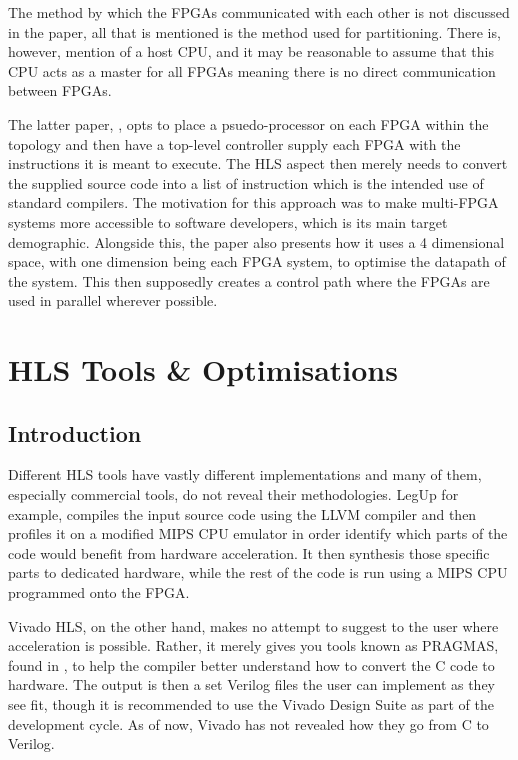 The method by which the FPGAs communicated with each other is not discussed in the paper, all that is mentioned is the method used for partitioning. There is, however, mention of a host CPU, and it may be reasonable to assume that this CPU acts as a master for all FPGAs meaning there is no direct communication between FPGAs.

The latter paper, \cite{707888}, opts to place a psuedo-processor on each FPGA within the topology and then have a top-level controller supply each FPGA with the instructions it is meant to execute. The HLS aspect then merely needs to convert the supplied source code into a list of instruction which is the intended use of standard compilers. The motivation for this approach was to make multi-FPGA systems more accessible to software developers, which is its main target demographic. Alongside this, the paper also presents how it uses a 4 dimensional space, with one dimension being each FPGA system, to optimise the datapath of the system. This then supposedly creates a control path where the FPGAs are used in parallel wherever possible.

\section{HLS Tools \& Optimisations}
\label{sec:bg:hls}

\subsection{Introduction}

Different HLS tools have vastly different implementations \cite{7368920} and many of them, especially commercial tools, do not reveal their methodologies. LegUp\cite{legup} for example, compiles the input source code using the LLVM compiler and then profiles it on a modified MIPS CPU emulator in order identify which parts of the code would benefit from hardware acceleration. It then synthesis those specific parts to dedicated hardware, while the rest of the code is run using a MIPS CPU programmed onto the FPGA.

Vivado HLS, on the other hand, makes no attempt to suggest to the user where acceleration is possible. Rather, it merely gives you tools known as PRAGMAS, found in \cite{vivado-optmisation-manual}, to help the compiler better understand how to convert the C code to hardware. The output is then a set Verilog files the user can implement as they see fit, though it is recommended to use the Vivado Design Suite \cite{vivado-design-suite-manual} as part of the development cycle. As of now, Vivado has not revealed how they go from C to Verilog.

